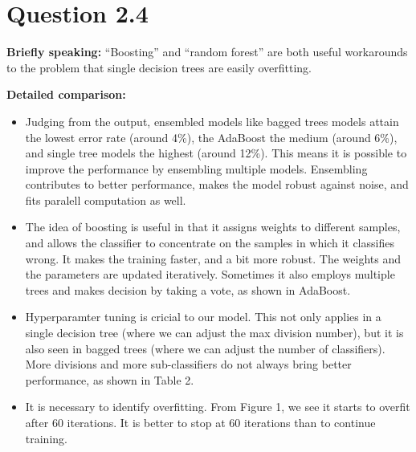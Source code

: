 \documentclass{article}
\begin{document}
\section*{Question 2.4}
{
    \textbf{Briefly speaking:}\quad
    ``Boosting'' and ``random forest'' are both useful workarounds to the problem that single decision trees are easily overfitting. 

    \textbf{Detailed comparison:}
    \begin{itemize}
        \item Judging from the output, ensembled models like bagged trees models attain the lowest error rate (around 4\%), the AdaBoost the medium (around 6\%), and single tree models the highest (around 12\%). This means it is possible to improve the performance by ensembling multiple models. Ensembling contributes to better performance, makes the model robust against noise, and fits paralell computation as well.

        \item The idea of boosting is useful in that it assigns weights to different samples, and allows the classifier to concentrate on the samples in which it classifies wrong. It makes the training faster, and a bit more robust. The weights and the parameters are updated iteratively. Sometimes it also employs multiple trees and makes decision by taking a vote, as shown in AdaBoost.

        \item Hyperparamter tuning is cricial to our model. This not only applies in a single decision tree (where we can adjust the max division number), but it is also seen in bagged trees (where we can adjust the number of classifiers). More divisions and more sub-classifiers do not always bring better performance, as shown in Table 2.
        
        \item It is necessary to identify overfitting. From Figure 1, we see it starts to overfit after 60 iterations. It is better to stop at 60 iterations than to continue training. 
    \end{itemize}
}
\end{document}

